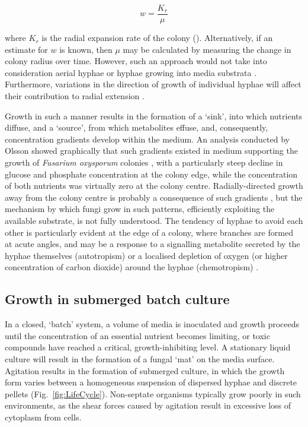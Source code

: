 \begin{equation}
	w = \frac{K_r}{\mu}
\end{equation}

\noindent where $K_r$ is the radial expansion rate of the colony (\omich). Alternatively, if an estimate for $w$ is known, then $\mu$ may be calculated by measuring the change in colony radius over time. However, such an approach would not take into consideration aerial hyphae or hyphae growing into media substrata \cite{moore-landecker1996}. Furthermore, variations in the direction of growth of individual hyphae will affect their contribution to radial extension \cite{prosser1995}.

Growth in such a manner results in the formation of a \lq sink', into which nutrients diffuse, and a \lq source', from which metabolites effuse, and, consequently, concentration gradients develop within the medium. An analysis conducted by Olsson showed graphically that such gradients existed in medium supporting the growth of \emph{Fusarium oxysporum} colonies \cite{olsson1994}, with a particularly steep decline in glucose and phosphate concentration at the colony edge, while the concentration of both nutrients was virtually zero at the colony centre. Radially-directed growth away from the colony centre is probably a consequence of such gradients \cite{carlile2001}, but the mechanism by which fungi grow in such patterns, efficiently exploiting the available substrate, is not fully understood. The tendency of hyphae to avoid each other is particularly evident at the edge of a colony, where branches are formed at acute angles, and may be a response to a signalling metabolite secreted by the hyphae themselves (autotropism) or a localised depletion of oxygen (or higher concentration of carbon dioxide) around the hyphae (chemotropism) \cite{robson1999}.

\subsection{Growth in submerged batch culture}

In a closed, \lq batch' system, a volume of media is inoculated and growth proceeds until the concentration of an essential nutrient becomes limiting, or toxic compounds have reached a critical, growth-inhibiting level. A stationary liquid culture will result in the formation of a fungal \lq mat' on the media surface. Agitation results in the formation of submerged culture, in which the growth form varies between a homogeneous suspension of dispersed hyphae and discrete pellets (Fig.~\ref{fig:LifeCycle}). Non-septate organisms typically grow poorly in such environments, as the shear forces caused by agitation result in excessive loss of cytoplasm from cells.

